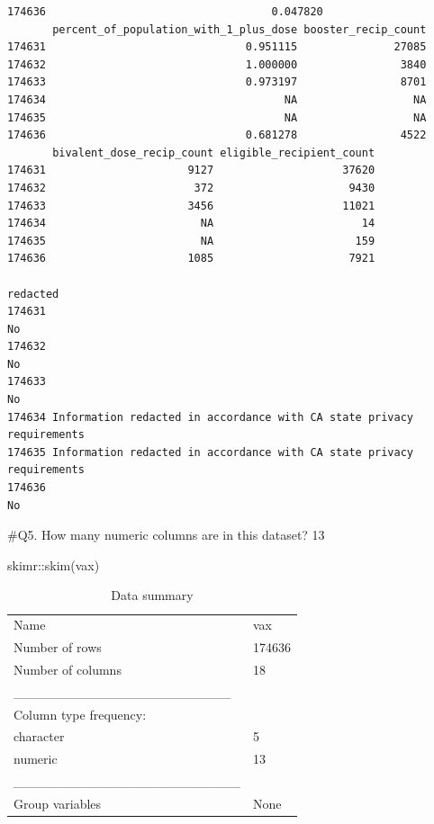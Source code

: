 \documentclass[
  letterpaper,
  DIV=11,
  numbers=noendperiod]{scrartcl}
\newenvironment{Shaded}{\begin{snugshade}}{\end{snugshade}}
\newcommand{\FunctionTok}[1]{\textcolor[rgb]{0.28,0.35,0.67}{#1}}
\newcommand{\NormalTok}[1]{\textcolor[rgb]{0.00,0.23,0.31}{#1}}
\newcommand{\SpecialCharTok}[1]{\textcolor[rgb]{0.37,0.37,0.37}{#1}}
\begin{document}
\begin{verbatim}
174636                                   0.047820
       percent_of_population_with_1_plus_dose booster_recip_count
174631                               0.951115               27085
174632                               1.000000                3840
174633                               0.973197                8701
174634                                     NA                  NA
174635                                     NA                  NA
174636                               0.681278                4522
       bivalent_dose_recip_count eligible_recipient_count
174631                      9127                    37620
174632                       372                     9430
174633                      3456                    11021
174634                        NA                       14
174635                        NA                      159
174636                      1085                     7921
                                                                    redacted
174631                                                                    No
174632                                                                    No
174633                                                                    No
174634 Information redacted in accordance with CA state privacy requirements
174635 Information redacted in accordance with CA state privacy requirements
174636                                                                    No
\end{verbatim}

\#Q5. How many numeric columns are in this dataset? 13

\begin{Shaded}
\begin{Highlighting}[]
\NormalTok{skimr}\SpecialCharTok{::}\FunctionTok{skim}\NormalTok{(vax)}
\end{Highlighting}
\end{Shaded}

\begin{longtable}[]{@{}ll@{}}
\caption{Data summary}\tabularnewline
\toprule()
\endhead
Name & vax \\
Number of rows & 174636 \\
Number of columns & 18 \\
\_\_\_\_\_\_\_\_\_\_\_\_\_\_\_\_\_\_\_\_\_\_\_ & \\
Column type frequency: & \\
character & 5 \\
numeric & 13 \\
\_\_\_\_\_\_\_\_\_\_\_\_\_\_\_\_\_\_\_\_\_\_\_\_ & \\
Group variables & None \\
\bottomrule()
\end{longtable}
\end{document}
